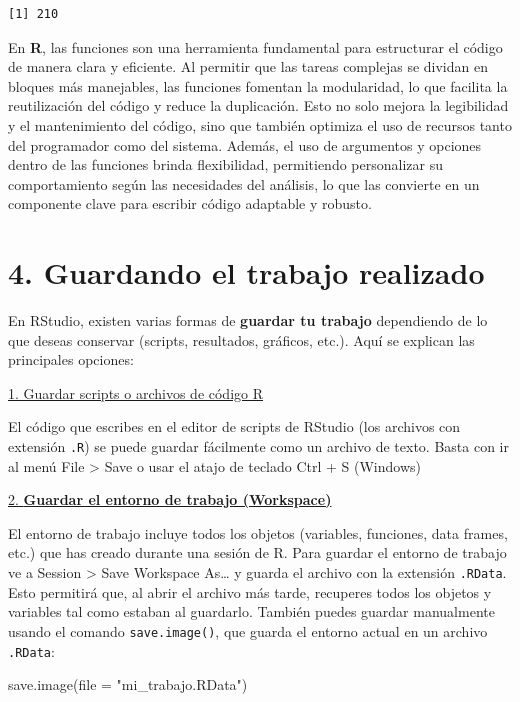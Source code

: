 \documentclass[
  letterpaper,
]{scrbook}
\newenvironment{Shaded}{\begin{snugshade}}{\end{snugshade}}
\newcommand{\AttributeTok}[1]{\textcolor[rgb]{0.40,0.45,0.13}{#1}}
\newcommand{\FunctionTok}[1]{\textcolor[rgb]{0.28,0.35,0.67}{#1}}
\newcommand{\NormalTok}[1]{\textcolor[rgb]{0.00,0.23,0.31}{#1}}
\newcommand{\StringTok}[1]{\textcolor[rgb]{0.13,0.47,0.30}{#1}}
\begin{document}
\begin{verbatim}
[1] 210
\end{verbatim}

En \textbf{R}, las funciones son una herramienta fundamental para
estructurar el código de manera clara y eficiente. Al permitir que las
tareas complejas se dividan en bloques más manejables, las funciones
fomentan la modularidad, lo que facilita la reutilización del código y
reduce la duplicación. Esto no solo mejora la legibilidad y el
mantenimiento del código, sino que también optimiza el uso de recursos
tanto del programador como del sistema. Además, el uso de argumentos y
opciones dentro de las funciones brinda flexibilidad, permitiendo
personalizar su comportamiento según las necesidades del análisis, lo
que las convierte en un componente clave para escribir código adaptable
y robusto.

\hypertarget{guardando-el-trabajo-realizado}{%
\section{4. Guardando el trabajo
realizado}\label{guardando-el-trabajo-realizado}}

En RStudio, existen varias formas de \textbf{guardar tu trabajo}
dependiendo de lo que deseas conservar (scripts, resultados, gráficos,
etc.). Aquí se explican las principales opciones:

\uline{1. Guardar scripts o archivos de código R}

El código que escribes en el editor de scripts de RStudio (los archivos
con extensión \texttt{.R}) se puede guardar fácilmente como un archivo
de texto. Basta con ir al menú File \textgreater{} Save o usar el atajo
de teclado Ctrl + S (Windows)

\uline{2. \textbf{Guardar el entorno de trabajo (Workspace)}}

El entorno de trabajo incluye todos los objetos (variables, funciones,
data frames, etc.) que has creado durante una sesión de R. Para guardar
el entorno de trabajo ve a Session \textgreater{} Save Workspace
As\ldots{} y guarda el archivo con la extensión \texttt{.RData}. Esto
permitirá que, al abrir el archivo más tarde, recuperes todos los
objetos y variables tal como estaban al guardarlo. También puedes
guardar manualmente usando el comando \texttt{save.image()}, que guarda
el entorno actual en un archivo \texttt{.RData}:

\begin{Shaded}
\begin{Highlighting}[]
\FunctionTok{save.image}\NormalTok{(}\AttributeTok{file =} \StringTok{"mi\_trabajo.RData"}\NormalTok{) }
\end{Highlighting}
\end{Shaded}
\end{document}
